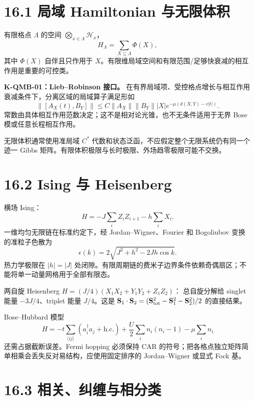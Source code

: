 \documentclass[
  11pt,
  oneside]{book}
\begin{document}
\hypertarget{ux5c40ux57df-hamiltonian-ux4e0eux65e0ux9650ux4f53ux79ef}{%
\section{16.1 局域 Hamiltonian
与无限体积}\label{ux5c40ux57df-hamiltonian-ux4e0eux65e0ux9650ux4f53ux79ef}}

有限格点 \(\Lambda\) 的空间 \(\bigotimes_{x\in\Lambda}\mathcal H_x\)，
\[
H_\Lambda=\sum_{X\subseteq\Lambda}\Phi(X),
\] 其中 \(\Phi(X)\) 自伴且只作用于
\(X\)。有限维局域空间和有限范围/足够快衰减的相互作用是重要的可控类。

\textbf{K-QMB-01：Lieb--Robinson 接口。}
在有界局域项、受控格点增长与相互作用衰减条件下，分离区域的局域算子满足形如
\[
\|[A_X(t),B_Y]\|
\le C\|A_X\|\|B_Y\||X|
e^{-\mu(d(X,Y)-v|t|)}.
\] 常数由具体相互作用范数决定；这不是相对论光锥，也不无条件适用于无界
Bose 模或任意长程相互作用。

无限体积通常使用准局域 \(C^*\)
代数和状态泛函，不应假定整个无限系统仍有同一个迹一 Gibbs
矩阵。有限体积极限与长时极限、外场趋零极限可能不交换。

\hypertarget{ising-ux4e0e-heisenberg}{%
\section{16.2 Ising 与 Heisenberg}\label{ising-ux4e0e-heisenberg}}

横场 Ising： \[
H=-J\sum_iZ_iZ_{i+1}-h\sum_iX_i.
\] 一维均匀无限链在标准约定下，经 Jordan--Wigner、Fourier 和 Bogoliubov
变换的准粒子色散为 \[
\epsilon(k)=2\sqrt{J^2+h^2-2Jh\cos k}.
\] 热力学极限在 \(|h|=|J|\)
处闭隙。有限周期链的费米子边界条件依赖奇偶扇区；不能将单一动量网格用于全部有限态。

两自旋 Heisenberg \(H=(J/4)(X_1X_2+Y_1Y_2+Z_1Z_2)\)： 总自旋分解给
singlet 能量 \(-3J/4\)、triplet 能量 \(J/4\)。这是
\(\mathbf S_1\cdot\mathbf S_2=(\mathbf S_{\rm tot}^2-\mathbf S_1^2-\mathbf S_2^2)/2\)
的直接结果。

Bose--Hubbard 模型 \[
H=-t\sum_{\langle ij\rangle}(a_i^\dagger a_j+\mathrm{h.c.})
+\frac U2\sum_i n_i(n_i-1)-\mu\sum_i n_i
\] 还需占据截断误差。Fermi hopping 必须保持 CAR
的符号；把各格点独立矩阵简单相乘会丢失反对易结构，应使用固定排序的
Jordan--Wigner 或显式 Fock 基。

\hypertarget{ux76f8ux5173ux7ea0ux7f20ux4e0eux76f8ux5206ux7c7b}{%
\section{16.3
相关、纠缠与相分类}\label{ux76f8ux5173ux7ea0ux7f20ux4e0eux76f8ux5206ux7c7b}}
\end{document}
